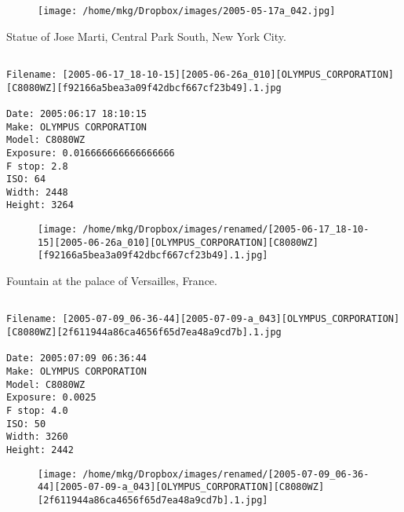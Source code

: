 \begin{figure}
\texttt{[image: /home/mkg/Dropbox/images/2005-05-17a\_042.jpg]}
\end{figure}
    
\clearpage
\onecolumn
\noindent Statue of Jose Marti, Central Park South, New York City.
\noindent
\begin{lstlisting}

Filename: [2005-06-17_18-10-15][2005-06-26a_010][OLYMPUS_CORPORATION][C8080WZ][f92166a5bea3a09f42dbcf667cf23b49].1.jpg

Date: 2005:06:17 18:10:15
Make: OLYMPUS CORPORATION
Model: C8080WZ
Exposure: 0.016666666666666666
F stop: 2.8
ISO: 64
Width: 2448
Height: 3264
\end{lstlisting}
\clearpage

\begin{figure}
\texttt{[image: /home/mkg/Dropbox/images/renamed/[2005-06-17\_18-10-15][2005-06-26a\_010][OLYMPUS\_CORPORATION][C8080WZ][f92166a5bea3a09f42dbcf667cf23b49].1.jpg]}
\end{figure}
    
\clearpage
\onecolumn
\noindent Fountain at the palace of Versailles, France.
\noindent
\begin{lstlisting}

Filename: [2005-07-09_06-36-44][2005-07-09-a_043][OLYMPUS_CORPORATION][C8080WZ][2f611944a86ca4656f65d7ea48a9cd7b].1.jpg

Date: 2005:07:09 06:36:44
Make: OLYMPUS CORPORATION
Model: C8080WZ
Exposure: 0.0025
F stop: 4.0
ISO: 50
Width: 3260
Height: 2442
\end{lstlisting}
\clearpage

\begin{figure}
\texttt{[image: /home/mkg/Dropbox/images/renamed/[2005-07-09\_06-36-44][2005-07-09-a\_043][OLYMPUS\_CORPORATION][C8080WZ][2f611944a86ca4656f65d7ea48a9cd7b].1.jpg]}
\end{figure}
    
